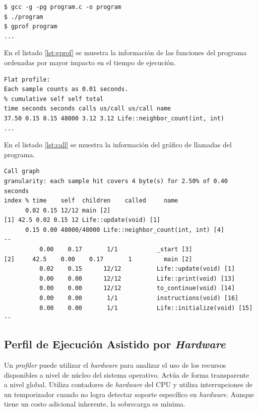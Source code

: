 \documentclass[a4paper]{report}
\begin{document}
\begin{lstlisting}[caption={Compilación con Información de Depuración},label={debug}]
$ gcc -g -pg program.c -o program
$ ./program
$ gprof program
...
\end{lstlisting}

En el listado \ref{lst:gprof} se muestra la información de las funciones del programa ordenadas por mayor impacto en el tiempo de ejecución.

\begin{lstlisting}[caption={Perfil de Rendimiento},label={lst:gprof}]
Flat profile:
Each sample counts as 0.01 seconds.
% cumulative self self total
time seconds seconds calls us/call us/call name
37.50 0.15 0.15 48000 3.12 3.12 Life::neighbor_count(int, int)
...
\end{lstlisting}

En el listado \ref{lst:call} se muestra la información del gráfico de llamadas del programa.

\begin{lstlisting}[caption={Gráficos de Llamadas},label={lst:call}]
Call graph
granularity: each sample hit covers 4 byte(s) for 2.50% of 0.40 seconds
index % time    self  children    called     name
      0.02 0.15 12/12 main [2]
[1] 42.5 0.02 0.15 12 Life::update(void) [1]
      0.15 0.00 48000/48000 Life::neighbor_count(int, int) [4]
--
          0.00    0.17       1/1           _start [3]
[2]     42.5    0.00    0.17       1         main [2]
          0.02    0.15      12/12          Life::update(void) [1]
          0.00    0.00      12/12          Life::print(void) [13]
          0.00    0.00      12/12          to_continue(void) [14]
          0.00    0.00       1/1           instructions(void) [16]
          0.00    0.00       1/1           Life::initialize(void) [15]
--
\end{lstlisting}

\subsection{Perfil de Ejecución Asistido por {\it Hardware}}

Un {\it profiler} puede utilizar el {\it hardware} para analizar el uso de los recursos disponibles a nivel de núcleo del
sistema operativo. Actúa de forma transparente a nivel global. Utiliza
contadores de {\it hardware} del CPU y utiliza interrupciones de un temporizador
cuando no logra detectar soporte específico en {\it hardware}. Aunque tiene un costo adicional inherente, la sobrecarga es mínima.
\end{document}
